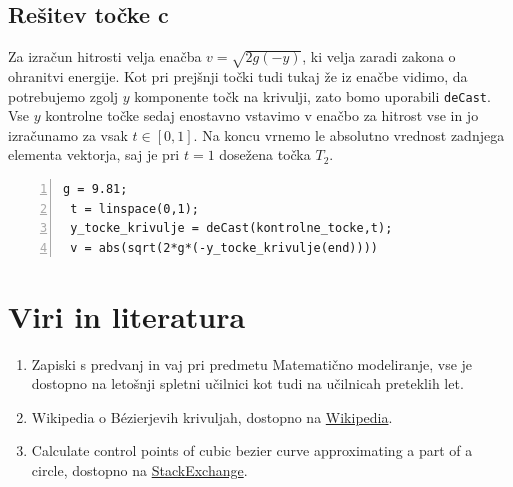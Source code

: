 \documentclass[a4paper,12pt]{article}
\begin{document}
	\subsection{Rešitev točke c}
	
	Za izračun hitrosti velja enačba $v = \sqrt{2g(-y)}$, ki velja zaradi zakona o ohranitvi energije. 
	Kot pri prejšnji točki tudi tukaj že iz enačbe vidimo, da potrebujemo zgolj $y$ komponente točk na krivulji, zato bomo
	uporabili \lstinline[style=Matlab-editor]!deCast!. Vse $y$ kontrolne točke sedaj enostavno vstavimo v enačbo za hitrost vse in
	jo izračunamo za vsak $t \in [0,1]$. Na koncu vrnemo le absolutno vrednost zadnjega elementa vektorja, saj je pri $t = 1$ dosežena točka $T_2$.

	\begin{lstlisting}[style=Matlab-editor,	numbers=left,]
 g = 9.81;
 t = linspace(0,1);
 y_tocke_krivulje = deCast(kontrolne_tocke,t);
 v = abs(sqrt(2*g*(-y_tocke_krivulje(end))))
	\end{lstlisting}
	

	\section{Viri in literatura}
	
	\begin{enumerate}[label=\textbullet]
		\item Zapiski s predvanj in vaj pri predmetu Matematično modeliranje, vse je dostopno na letošnji spletni učilnici kot tudi na učilnicah preteklih let.
		\item Wikipedia o B\'{e}zierjevih krivuljah, dostopno na \href{https://sl.wikipedia.org/wiki/Bézierova_krivulja}{Wikipedia}.
		\item Calculate control points of cubic bezier curve approximating a part of a circle, dostopno na \href{https://math.stackexchange.com/questions/873224/calculate-control-points-of-cubic-bezier-curve-approximating-a-part-of-a-circle}{StackExchange}.
	\end{enumerate}
	
\end{document}
